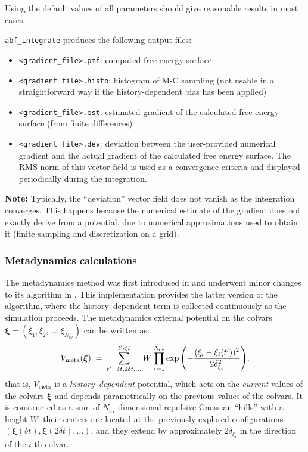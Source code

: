 Using the default values of all parameters should give reasonable results in most cases.

\bigskip
\texttt{abf\_integrate} produces the following output files:
\begin{itemize}
\setlength{\itemsep}{0pt}
\item \texttt{<gradient\_file>.pmf}: computed free energy surface
\item \texttt{<gradient\_file>.histo}: histogram of M-C sampling (not
usable in a straightforward way if the history-dependent bias has been applied)
\item \texttt{<gradient\_file>.est}: estimated gradient of the calculated free energy surface
(from finite differences)
\item \texttt{<gradient\_file>.dev}: deviation between the user-provided numerical gradient
and the actual gradient of the calculated free energy surface. The RMS norm of this vector
field is used as a convergence criteria and displayed periodically during the integration.
\end{itemize}

\textbf{Note:} Typically, the ``deviation'' vector field does not vanish as the integration
converges. This happens because the numerical estimate of the gradient does not exactly derive from a
potential, due to numerical approximations used to obtain it (finite sampling and
discretization on a grid).



\subsubsection{Metadynamics calculations}
\label{sec:colvarbias_meta}

The metadynamics method was first introduced in \cite{Laio2002} and
underwent minor changes to its algorithm in \cite{Iannuzzi2003}.
This implementation provides the latter version of the algorithm,
where the history--dependent term is collected continuously as the
simulation proceeds.  The metadynamics external potential on the
colvars $\bm{\xi} = (\xi_{1}, \xi_{2}, \ldots,
\xi_{N_{\mathrm{cv}}})$ can be written as:
\begin{equation}
  \label{eq:colvars_meta_pot}
  V_{\mathrm{meta}}({\mbox{\boldmath{$\xi$}}}) \; = \; {
    \sum_{t' = \delta{}t, \\ 2\delta{}t, \\ \ldots}^{t'<t} W \: {
      \prod_{i = 1}^{N_{\mathrm{cv}}}
      \exp\left(-\frac{(\xi_{i}-\xi_{i}(t'))^{2}}{2\delta_{\xi_{i}}^{2}}\right)
    }
  }\mathrm{,}
\end{equation}
that is, $V_{\mathrm{meta}}$ is a \emph{history--dependent} potential,
which acts on the \emph{current} values of the colvars $\bm{\xi}$ and
depends parametrically on the previous values of the colvars.  It is
constructed as a sum of $N_{\mathrm{cv}}$-dimensional repulsive
Gaussian ``hills'' with a height $W$: their centers are located at the
previously explored configurations $\left(\bm{\xi}(\delta{}t),
  \bm{\xi}(2\delta{}t), \ldots\right)$, and they extend by
approximately $2\delta_{\xi_{i}}$ in the direction of the $i$-th
colvar.


